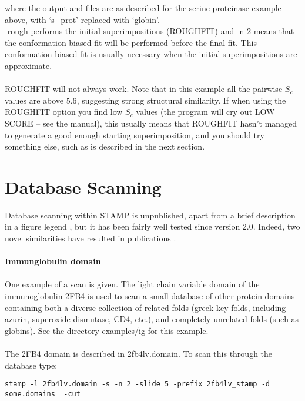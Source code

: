 where the output and files are as described for the serine proteinase example above,
with `s\_prot' replaced with `globin'.\\

-rough performs the initial superimpositions (ROUGHFIT) and -n 2 means that the conformation 
biased fit will be performed before the final fit.  This conformation biased fit is
usually necessary when the initial superimpositions are approximate.\\
\\
ROUGHFIT will not always work.  Note that in this example all the pairwise
$S_{c}$ values are above $5.6$, suggesting strong structural similarity.  If
when using the ROUGHFIT option you find low $S_{c}$ values (the program will
cry out LOW SCORE -- see the manual), this usually means that ROUGHFIT hasn't
managed to generate a good enough starting superimposition, and you should
try something else, such as is described in the next section.

\section{Database Scanning}

Database scanning within STAMP is unpublished, apart from a brief description in a figure 
legend \cite{matthews94}, but it has been fairly well tested
since version 2.0.  Indeed, two novel similarities have resulted
in publications \cite{rb93b,matthews94}.\\
\\
{\bf Immunglobulin domain}\\
\\
One example of a scan is given.  The light chain variable domain
of the immunoglobulin 2FB4 is used to scan a small database of
other protein domains containing both a diverse collection of
related folds (greek key folds, including azurin, superoxide
dismutase, CD4, etc.), and completely unrelated folds (such as
globins).  See the directory examples/ig for this example.\\
\\
The 2FB4 domain is described in 2fb4lv.domain.  To scan this 
through the database type:\\

\begin{scriptsize}\begin{verbatim}
stamp -l 2fb4lv.domain -s -n 2 -slide 5 -prefix 2fb4lv_stamp -d some.domains  -cut
\end{verbatim} \end{scriptsize}

